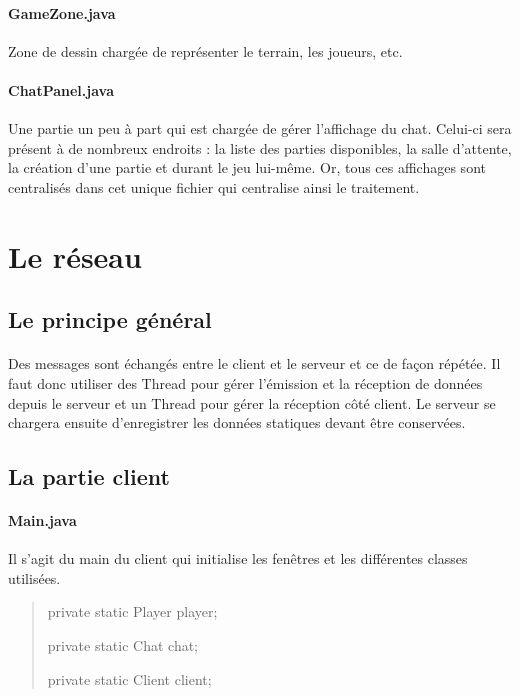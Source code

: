 \documentclass[a4paper,12pt]{report}
\begin{document}
\paragraph{GameZone.java}
Zone de dessin chargée de représenter le terrain, les joueurs, etc.
\paragraph{ChatPanel.java}
Une partie un peu à part qui est chargée de gérer l'affichage du chat. Celui-ci sera présent à de nombreux endroits : la liste des parties disponibles, la salle d'attente, la création d'une partie et durant le jeu lui-même. Or, tous ces affichages sont centralisés dans cet unique fichier qui centralise ainsi le traitement.


\section{Le réseau}
\subsection{Le principe général}
\paragraph{}
Des messages sont échangés entre le client et le serveur et ce de façon répétée. Il faut donc utiliser des Thread pour gérer l'émission et la réception de données depuis le serveur et un Thread pour gérer la réception côté client. Le serveur se chargera ensuite d'enregistrer les données statiques devant être conservées.
\subsection{La partie client}
\paragraph{Main.java}
Il s'agit du main du client qui initialise les fenêtres et les différentes classes utilisées.
\begin{quote}
	private static Player player;
    
	private static Chat chat;
    
	private static Client client;
\end{quote}
\end{document}
